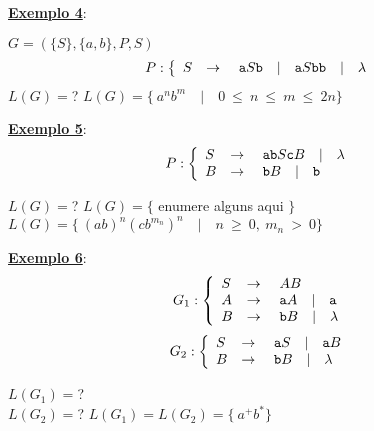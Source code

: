 \vspace{1cm}
\textbf{\underline{Exemplo 4}}:\\

\begin{center}
   $G = ( \{S\}, \{a, b\}, P, S) $\\
   \[
    P:\left\{
      \begin{array}{l c l}
        S & \rightarrow & \ \texttt{a}S\texttt{b} \quad | \quad \texttt{a}S\texttt{bb} \quad | \quad \lambda \\
      \end{array}
      \right.
   \]
    {\color{red} $ L(G) = ${\Huge ?} }
    \makebox[\linewidth]{\rule{\paperwidth/2}{0.4pt}}
    \vspace{1cm}
   {\color{blue}
   $ L(G) = \{ \ a^{n}b^{m} \quad | \quad 0 \ \leqslant \ n \ \leqslant \ m \ \leqslant \ 2n \}$ \\
   }
\end{center}
\vspace{1cm}
\textbf{\underline{Exemplo 5}}:\\
   \[
      P:\left\{
      \begin{array}{l c l}
        S & \rightarrow & \ \texttt{ab}S\texttt{c}B \quad | \quad \lambda \\
	B & \rightarrow & \ \texttt{b}B  \quad | \quad \texttt{b}  \\
      \end{array}
      \right.
  \]
\begin{center}
  {\color{red} $ L(G) = ${\Huge ?} }
  \makebox[\linewidth]{\rule{\paperwidth/2}{0.4pt}}
  \vspace{1cm}
  {\color{blue} $ L(G) = \{$ enumere alguns aqui $\}$\\
   $ L(G) = \{ \ (ab)^{n}(cb^{m_n})^{n} \quad | \quad n \ \geqslant \ 0, \ m_n \ > \ 0 \}$ }
\end{center}
\vspace{1cm}
\textbf{\underline{Exemplo 6}}:\\
   \[
      G_1:\left\{
      \begin{array}{l c l}
        S & \rightarrow & \ AB \\
        A & \rightarrow & \ \texttt{a}A \quad | \quad \texttt{a}  \\
	B & \rightarrow & \ \texttt{b}B \quad | \quad \lambda  \\
      \end{array}
      \right.\] \[
      G_2:\left\{
      \begin{array}{l c l}
        S & \rightarrow & \ \texttt{a}S \quad | \quad \texttt{a}B \\
	B & \rightarrow & \ \texttt{b}B \quad | \quad \lambda  \\
      \end{array}
      \right.
  \]
\begin{center}
  {\color{red} $ L(G_1) = ${\Huge ?}\\
               $ L(G_2) = ${\Huge ?} }
  \makebox[\linewidth]{\rule{\paperwidth/2}{0.4pt}}
  \vspace{1cm}
  {\color{blue} $ L(G_1) = L(G_2) = \{ \ a^{+}b^{*} \}$ }
\end{center}

